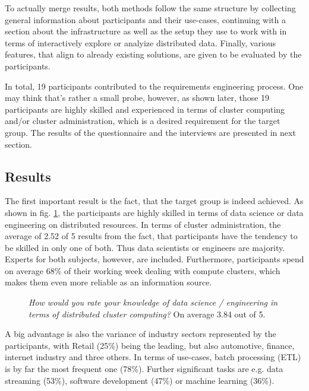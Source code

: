 \documentclass[a4paper,twoside]{article}
\begin{document}
To actually merge results, both methods follow the same structure by collecting general information about participants and their use-cases, continuing with a section about the infrastructure as well as the setup they use to work with in terms of interactively explore or analyize distributed data. Finally, various features, that align to already existing solutions, are given to be evaluated by the participants. 

In total, 19 participants contributed to the requirements engineering process. One may think that’s rather a small probe, however, as shown later, those 19 participants are highly skilled and experienced in terms of cluster computing and/or cluster administration, which is a desired requirement for the target group. The results of the questionnaire and the interviews are presented in next section.

\subsection{Results}

The first important result is the fact, that the target group is indeed achieved. As shown in fig. \ref{fig:self_rating}, the participants are highly skilled in terms of data science or data engineering on distributed resources. In terms of cluster administration, the average of 2.52 of 5 results from the fact, that participants have the tendency to be skilled in only one of both. Thus data scientists or engineers are majority. Experts for both subjects, however, are included. Furthermore, participants spend on average 68\% of their working week dealing with compute clusters, which makes them even more reliable as an information source. 

\begin{figure}[!h]
  \centering
   {}
  \caption{\textit{How would you rate your knowledge of data science / engineering in terms of distributed cluster computing?} On average 3.84 out of 5.}
  \label{fig:self_rating}
 \end{figure}

A big advantage is also the variance of industry sectors represented by the participants, with Retail (25\%) being the leading, but also automotive, finance, internet industry and three others. In terms of use-cases, batch processing (ETL) is by far the most frequent one (78\%). Further significant tasks are e.g. data streaming (53\%), software development (47\%) or machine learning (36\%). 
\end{document}

